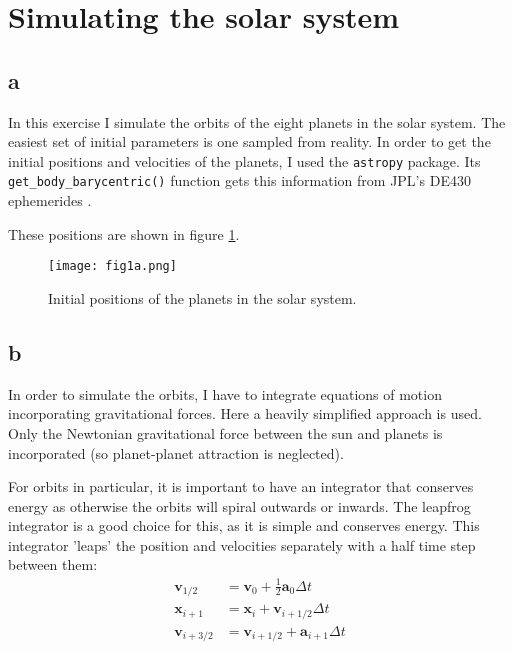 \section{Simulating the solar system}


\subsection*{a}
In this exercise I simulate the orbits of the eight planets in the solar system.
The easiest set of initial parameters is one sampled from reality.
In order to get the initial positions and velocities of the planets, I used the \texttt{astropy} package.
Its \texttt{get\_body\_barycentric()} function gets this information from JPL's DE430 ephemerides .

These positions are shown in figure \ref{fig:initial_positions}.

\begin{figure}
    \centering
    \texttt{[image: fig1a.png]}
    \caption{Initial positions of the planets in the solar system.}
    \label{fig:initial_positions}
\end{figure}



\subsection*{b}
In order to simulate the orbits, I have to integrate equations of motion incorporating gravitational forces.
Here a heavily simplified approach is used.
Only the Newtonian gravitational force between the sun and planets is incorporated (so planet-planet attraction is neglected).

For orbits in particular, it is important to have an integrator that conserves energy as otherwise the orbits will spiral outwards or inwards.
The leapfrog integrator is a good choice for this, as it is simple and conserves energy.
This integrator 'leaps' the position and velocities separately with a half time step between them:
\begin{align}
    \mathbf{v}_{1/2} &= \mathbf{v}_0 + \frac{1}{2} \mathbf{a}_0 \Delta t \\
    \mathbf{x}_{i+1} &= \mathbf{x}_i + \mathbf{v}_{i+1/2} \Delta t \\
    \mathbf{v}_{i+3/2} &= \mathbf{v}_{i+1/2} + \mathbf{a}_{i+1} \Delta t
\end{align}


